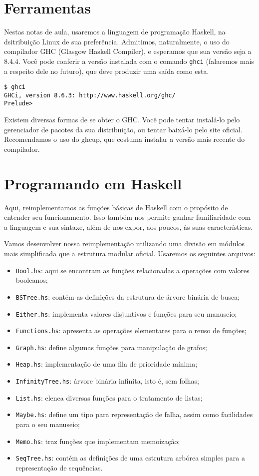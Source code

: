 \documentclass[a4paper]{article}
\begin{document}
\section{Ferramentas}

Nestas notas de aula, usaremos a linguagem de programação Haskell, na dsitribuição Linux de sua preferência.
Admitimos, naturalmente, o uso do compilador GHC (Glasgow Haskell Compiler), e esperamos que sua versão
seja a 8.4.4.
Você pode conferir a versão instalada com o comando \texttt{ghci} (falaremos mais a respeito dele no futuro), que deve
produzir uma saída como esta.

\begin{verbatim}
$ ghci
GHCi, version 8.6.3: http://www.haskell.org/ghc/
Prelude> 
\end{verbatim}

Existem diversas formas de se obter o GHC.
Você pode tentar instalá-lo pelo gerenciador de pacotes da sua distribuição, ou tentar baixá-lo pelo site oficial.
Recomendamos o uso do ghcup, que costuma instalar a versão mais recente do compilador.

\section{Programando em Haskell}

Aqui, reimplementamos as funções básicas de Haskell com o propósito de entender seu funcionamento.
Isso também nos permite ganhar familiaridade com a linguagem e sua sintaxe, além de nos expor, aos poucos, às suas características.

Vamos desenvolver nossa reimplementação utilizando uma divisão em módulos mais simplificada que a estrutura modular oficial.
Usaremos os seguintes arquivos:
\begin{itemize}
	\item \texttt{Bool.hs}: aqui se encontram as funções relacionadas a operações com valores booleanos;
	\item \texttt{BSTree.hs}: contém as definições da estrutura de árvore binária de busca;
	\item \texttt{Either.hs}: implementa valores disjuntivos e funções para seu manuseio;
	\item \texttt{Functions.hs}: apresenta as operações elementares para o reuso de funções;
	\item \texttt{Graph.hs}: define algumas funções para manipulação de grafos;
	\item \texttt{Heap.hs}: implementação de uma fila de prioridade mínima;
	\item \texttt{InfinityTree.hs}: árvore binária infinita, isto é, sem folhas;
	\item \texttt{List.hs}: elenca diversas funções para o tratamento de listas;
	\item \texttt{Maybe.hs}: define um tipo para representação de falha, assim como facilidades para o seu manuseio;
	\item \texttt{Memo.hs}: traz funções que implementam memoização;
	\item \texttt{SeqTree.hs}: contém as definições de uma estrutura arbórea simples para a representação de sequências.
\end{itemize}
\end{document}
